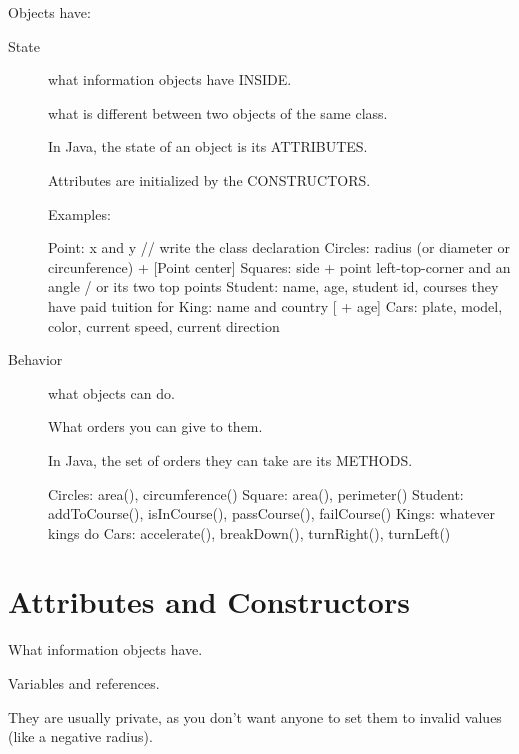 \documentclass[a4paper, 9pt]{extarticle}
\begin{document}
Objects have:

\begin{description}

  \item[State] what information objects have INSIDE.

    what is different between two objects of the
    same class.

    In Java, the state of an object is its ATTRIBUTES.

    Attributes are initialized by the CONSTRUCTORS.

    Examples:

\begin{blackboard}
  Point: x and y            // write the class declaration
  Circles: radius (or diameter or circunference) + [Point center]
  Squares: side + point left-top-corner and an angle / or its two top points
  Student: name, age, student id, courses they have paid tuition for
  King: name and country [ + age]
  Cars: plate, model, color, current speed, current direction
\end{blackboard}

  \item[Behavior] what objects can do.

    What orders you can give to them.

    In Java, the set of orders they can take are its METHODS.

\begin{blackboard}
  Circles: area(), circumference()
  Square: area(), perimeter()
  Student: addToCourse(), isInCourse(), passCourse(), failCourse()
  Kings: whatever kings do
  Cars: accelerate(), breakDown(), turnRight(), turnLeft()
\end{blackboard}
\end{description}













\section{Attributes and Constructors}

What information objects have.

Variables and references.

They are usually private, as you don't want anyone to set them to invalid values
(like a negative radius).
\end{document}
